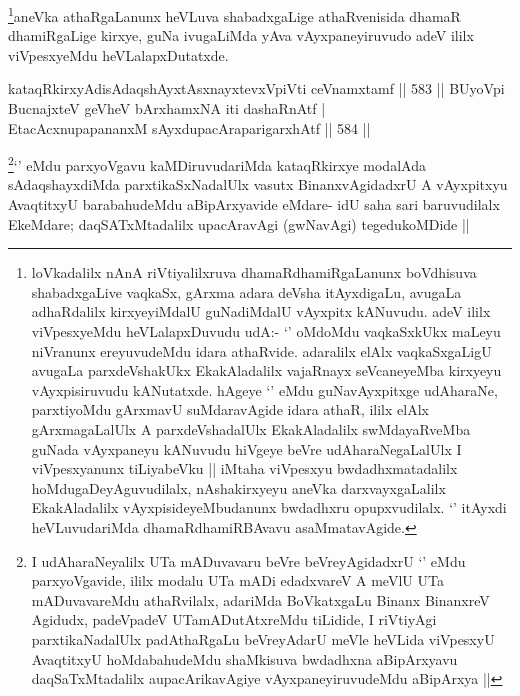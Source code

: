 \begin{artha}
\footnote{loVkadalilx nAnA riVtiyalilxruva dhamaRdhamiRgaLanunx boVdhisuva shabadxgaLive vaqkaSx, gArxma adara deVsha itAyxdigaLu, avugaLa adhaRdalilx kirxyeyiMdalU guNadiMdalU vAyxpitx kANuvudu. adeV ililx viVpesxyeMdu heVLalapxDuvudu udA:- `\stext' oMdoMdu vaqkaSxkUkx maLeyu niVranunx ereyuvudeMdu idara athaRvide. adaralilx elAlx vaqkaSxgaLigU avugaLa parxdeVshakUkx EkakAladalilx vajaRnayx seVcaneyeMba kirxyeyu vAyxpisiruvudu kANutatxde. hAgeye `\stext' eMdu guNavAyxpitxge udAharaNe, parxtiyoMdu gArxmavU suMdaravAgide idara athaR, ililx elAlx gArxmagaLalUlx A parxdeVshadalUlx EkakAladalilx swMdayaRveMba guNada vAyxpaneyu kANuvudu hiVgeye beVre udAharaNegaLalUlx I viVpesxyanunx tiLiyabeVku || iMtaha viVpesxyu bwdadhxmatadalilx hoMdugaDeyAguvudilalx, nAshakirxyeyu aneVka darxvayxgaLalilx EkakAladalilx vAyxpisideyeMbudanunx bwdadhxru opupxvudilalx. `\stext' itAyxdi heVLuvudariMda dhamaRdhamiRBAvavu asaMmatavAgide.}aneVka athaRgaLanunx heVLuva shabadxgaLige athaRvenisida dhamaR dhamiRgaLige kirxye, guNa ivugaLiMda yAva vAyxpaneyiruvudo adeV ililx viVpesxyeMdu heVLalapxDutatxde.
\end{artha}

				
\begin{shl}
kataqRkirxyAdisAdaqshAyxtAsx\s nayxtevxV\s piVti ceVnamxtamf \hfill||  583 ||  
BUyoV\s pi BucnajxteV geVheV bArxhamxNA iti dashaRnAtf | \\
EtacAcxnupapananxM sAyxdupacAraparigarxhAtf \hfill||  584 ||  
\end{shl}

\begin{artha}
\footnote{I udAharaNeyalilx UTa mADuvavaru beVre beVreyAgidadxrU `\stext' eMdu parxyoVgavide, ililx modalu UTa mADi edadxvareV A meVlU UTa mADuvavareMdu athaRvilalx, adariMda BoVkatxgaLu Binanx BinanxreV Agidudx, padeVpadeV UTamADutAtxreMdu tiLidide, I riVtiyAgi parxtikaNadalUlx padAthaRgaLu beVreyAdarU meVle heVLida viVpesxyU AvaqtitxyU hoMdabahudeMdu shaMkisuva bwdadhxna aBipArxyavu daqSaTxMtadalilx aupacArikavAgiye vAyxpaneyiruvudeMdu aBipArxya ||}`\stext' eMdu parxyoVgavu kaMDiruvudariMda kataqRkirxye modalAda sAdaqshayxdiMda parxtikaSxNadalUlx vasutx BinanxvAgidadxrU A vAyxpitxyu AvaqtitxyU barabahudeMdu aBipArxyavide eMdare- idU saha sari baruvudilalx EkeMdare; daqSATxMtadalilx upacAravAgi (gwNavAgi) tegedukoMDide ||
\end{artha}

